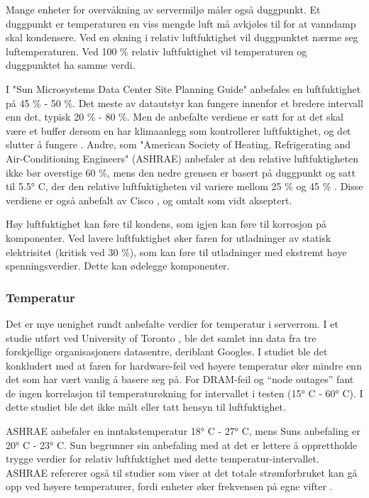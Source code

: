 Mange enheter for overvåkning av servermiljø måler også duggpunkt. Et duggpunkt er temperaturen en viss mengde luft må avkjøles til for at vanndamp skal kondensere. Ved en økning i relativ luftfuktighet vil duggpunktet nærme seg luftemperaturen. Ved 100 \% relativ luftfuktighet vil temperaturen og duggpunktet ha samme verdi. 

I "Sun Microsystems Data Center Site Planning Guide" anbefales en luftfuktighet på 45 \% - 50 \%. Det meste av datautstyr kan fungere innenfor et bredere intervall enn det, typisk 20 \% - 80 \%. Men de anbefalte verdiene er satt for at det skal være et buffer dersom en har klimaanlegg som kontrollerer luftfuktighet, og det slutter å fungere \cite{planningserver}. Andre, som "American Society of Heating, Refrigerating and Air-Conditioning Engineers" (ASHRAE) anbefaler at den relative luftfuktigheten ikke bør overstige 60 \%, mens den nedre grensen er basert på duggpunkt og satt til 5.5° C, der den relative luftfuktigheten vil variere mellom 25 \% og 45 \% \cite{envguide}. Disse verdiene er også anbefalt av Cisco \cite{envguidecisco}, og omtalt som vidt akseptert. 

Høy luftfuktighet kan føre til kondens, som igjen kan føre til korrosjon på komponenter. Ved lavere luftfuktighet øker faren for utladninger av statisk elektrisitet (kritisk ved 30 \%), som kan føre til utladninger med ekstremt høye spenningsverdier. Dette kan ødelegge komponenter.

\subsubsection{Temperatur}
Det er mye uenighet rundt anbefalte verdier for temperatur i serverrom. I et studie utført ved University of Toronto \cite{torontopaper}, ble det samlet inn data fra tre forskjellige organisasjoners datasentre, deriblant Googles. I studiet ble det konkludert med at faren for hardware-feil ved høyere temperatur øker mindre enn det som har vært vanlig å basere seg på. For DRAM-feil og ``node outages'' fant de ingen korrelasjon til temperaturøkning for intervallet i testen (15° C - 60° C). I dette studiet ble det ikke målt eller tatt hensyn til luftfuktighet. 

ASHRAE anbefaler en inntakstemperatur 18° C - 27° C, mens Suns anbefaling er 20° C - 23° C. Sun begrunner sin anbefaling med at det er lettere å opprettholde trygge verdier for relativ luftfuktighet med dette temperatur-intervallet. ASHRAE refererer også til studier som viser at det totale strømforbruket kan gå opp ved høyere temperaturer, fordi enheter øker frekvensen på egne vifter \cite{datacentertemp}.


